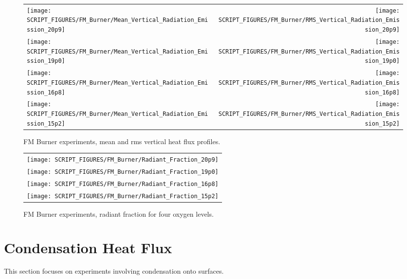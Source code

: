 \begin{figure}[p]
\begin{tabular*}{\textwidth}{l@{\extracolsep{\fill}}r}
\texttt{[image: SCRIPT\_FIGURES/FM\_Burner/Mean\_Vertical\_Radiation\_Emission\_20p9]} &
\texttt{[image: SCRIPT\_FIGURES/FM\_Burner/RMS\_Vertical\_Radiation\_Emission\_20p9]} \\
\texttt{[image: SCRIPT\_FIGURES/FM\_Burner/Mean\_Vertical\_Radiation\_Emission\_19p0]} &
\texttt{[image: SCRIPT\_FIGURES/FM\_Burner/RMS\_Vertical\_Radiation\_Emission\_19p0]} \\
\texttt{[image: SCRIPT\_FIGURES/FM\_Burner/Mean\_Vertical\_Radiation\_Emission\_16p8]} &
\texttt{[image: SCRIPT\_FIGURES/FM\_Burner/RMS\_Vertical\_Radiation\_Emission\_16p8]} \\
\texttt{[image: SCRIPT\_FIGURES/FM\_Burner/Mean\_Vertical\_Radiation\_Emission\_15p2]} &
\texttt{[image: SCRIPT\_FIGURES/FM\_Burner/RMS\_Vertical\_Radiation\_Emission\_15p2]}
\end{tabular*}
\caption[FM Burner experiments, mean and rms vertical heat flux profiles]
{FM Burner experiments, mean and rms vertical heat flux profiles.}
\label{FM_Burner_Vertical_Heat_Flux}
\end{figure}

\begin{figure}[p]
\begin{center}
\begin{tabular}{c}
\texttt{[image: SCRIPT\_FIGURES/FM\_Burner/Radiant\_Fraction\_20p9]} \\
\texttt{[image: SCRIPT\_FIGURES/FM\_Burner/Radiant\_Fraction\_19p0]} \\
\texttt{[image: SCRIPT\_FIGURES/FM\_Burner/Radiant\_Fraction\_16p8]} \\
\texttt{[image: SCRIPT\_FIGURES/FM\_Burner/Radiant\_Fraction\_15p2]}
\end{tabular}
\end{center}
\caption[FM Burner experiments, radiant fraction]
{FM Burner experiments, radiant fraction for four oxygen levels.}
\label{FM_Burner_Radiant_Fraction}
\end{figure}



\clearpage

\section{Condensation Heat Flux}
\label{Condensation}
This section focuses on experiments involving condensation onto surfaces.

